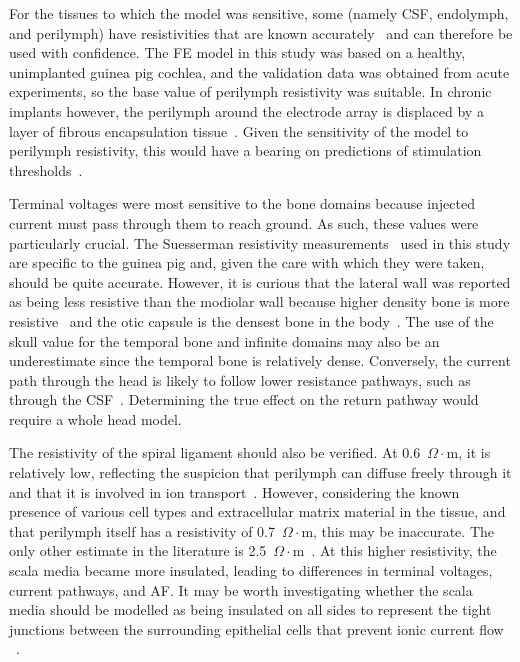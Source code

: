 For the tissues to which the model was sensitive, some (namely CSF, endolymph,
and perilymph) have resistivities that are known
accurately~\cite{frijns1995,gabriel2009} and can therefore be used with
confidence. The FE model in this study was based on a healthy, unimplanted
guinea pig cochlea, and the validation data was obtained from acute experiments,
so the base value of perilymph resistivity was suitable. In chronic implants
however, the perilymph around the electrode array is displaced by a layer of
fibrous encapsulation tissue~\cite{grill1994}. Given the sensitivity of the
model to perilymph resistivity, this would have a bearing on predictions of
stimulation thresholds~\cite{hanekom2005}.

Terminal voltages were most sensitive to the bone domains because injected
current must pass through them to reach ground. As such, these values were
particularly crucial. The Suesserman resistivity
measurements~\cite{suesserman1992} used in this study are specific to the guinea
pig and, given the care with which they were taken, should be quite accurate.
However, it is curious that the lateral wall was reported as being less
resistive than the modiolar wall because higher density bone is more
resistive~\cite{williams1996} and the otic capsule is the densest bone in the
body~\cite{bast1949}. The use of the skull value for the temporal bone and
infinite domains may also be an underestimate since the temporal bone is
relatively dense. Conversely, the current path through the head is likely to
follow lower resistance pathways, such as through the CSF~\cite{tran2015}.
Determining the true effect on the return pathway would require a whole head
model.

The resistivity of the spiral ligament should also be verified. At 0.6~$ \Omega
\cdot $m, it is relatively low, reflecting the suspicion that perilymph can
diffuse freely through it and that it is involved in ion
transport~\cite{dallos1996,slepecky1996}. However, considering the known
presence of various cell types and extracellular matrix material in the tissue,
and that perilymph itself has a resistivity of 0.7~$ \Omega \cdot $m, this may
be inaccurate. The only other estimate in the literature is 2.5~$ \Omega \cdot
$m~\cite{girzon1987}. At this higher resistivity, the scala media became more
insulated, leading to differences in terminal voltages, current pathways, and
AF. It may be worth investigating whether the scala media should be modelled as
being insulated on all sides to represent the tight junctions between the
surrounding epithelial cells that prevent ionic current flow
\invivo{}~\cite{dallos1996}.

